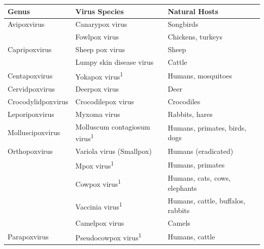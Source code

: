 \renewcommand{\arraystretch}{1.5}
\begin{table}[ht!]
	\begin{tabular}{lll}
	\hline
	\textbf{Genus}      & \textbf{Virus Species}                          & \textbf{Natural Hosts}                      \\ \hline
	Avipoxvirus         & Canarypox virus                                 & Songbirds 									\\ 
						& Fowlpox virus                                   & Chickens, turkeys                           \\ \hline
	Capripoxvirus       & Sheep pox virus                                 & Sheep                                       \\
	                    & Lumpy skin disease virus                        & Cattle                                      \\ \hline
	Centapoxvirus       & Yokapox virus\textsuperscript{1}                & Humans, mosquitoes                          \\ \hline
	Cervidpoxvirus      & Deerpox virus                                   & Deer                                        \\ \hline
	Crocodylidpoxvirus  & Crocodilepox virus                              & Crocodiles                                  \\ \hline
	Leporipoxvirus      & Myxoma virus                                    & Rabbits, hares                              \\ \hline
	Molluscipoxvirus    & Molluscum contagiosum virus\textsuperscript{1}  & Humans, primates, birds, dogs               \\ \hline
	Orthopoxvirus       & Variola virus (Smallpox)                        & Humans (eradicated)                         \\ 
						& Mpox virus\textsuperscript{1}                   & Humans, primates                            \\ 
						& Cowpox virus\textsuperscript{1}                 & Humans, cats, cows, elephants               \\ 
						& Vaccinia virus\textsuperscript{1}               & Humans, cattle, buffalos, rabbits           \\ 
						& Camelpox virus                                  & Camels                                      \\ \hline
	Parapoxvirus        & Pseudocowpox virus\textsuperscript{1}           & Humans, cattle                              \\ 

\end{tabular}
\end{table}
